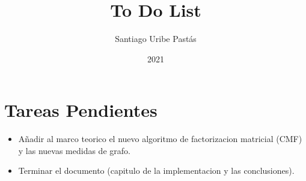\documentclass{article}
\title{To Do List}
\author{Santiago Uribe Pastás}
\date{2021}
\begin{document}
\maketitle

\section{Tareas Pendientes}
\begin{itemize}
    \item Añadir al marco teorico el nuevo algoritmo de factorizacion matricial (CMF) y las nuevas medidas de grafo.
    \item Terminar el documento (capitulo de la implementacion y las conclusiones).
\end{itemize}
\end{document}

